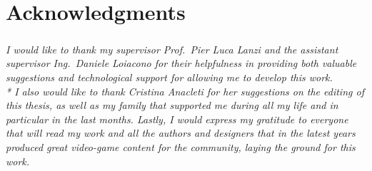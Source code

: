 \chapter*{Acknowledgments}
\paragraph{} \textit{
	I would like to thank my supervisor Prof.~Pier Luca Lanzi and the assistant supervisor Ing.~Daniele Loiacono for their helpfulness in providing both valuable suggestions and technological support for allowing me to develop this work. 
	\\* I also would like to thank Cristina Anacleti for her suggestions on the editing of this thesis, as well as my family that supported me during all my life and in particular in the last months. Lastly, I would express my gratitude to everyone that will read my work and all the authors and designers that in the latest years produced great video-game content for the community, laying the ground for this work.
	}